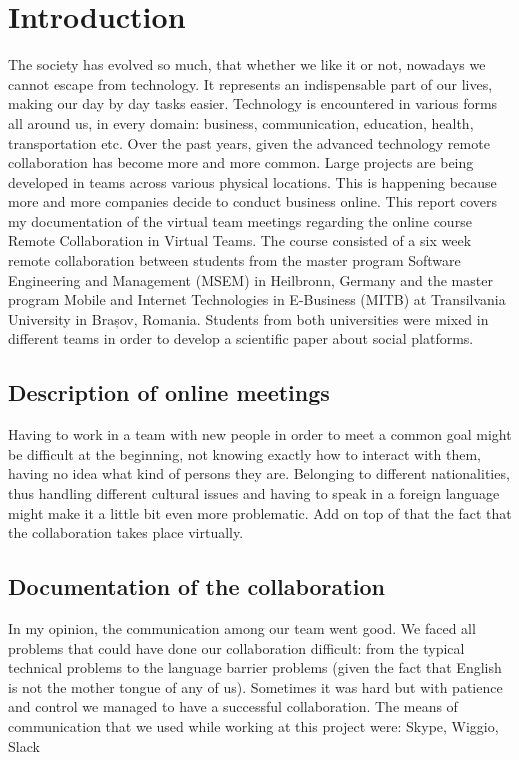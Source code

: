 
\chapter{Introduction } %

\label{ChapterX} %


The society has evolved so much, that whether we like it or not, nowadays we cannot escape from technology. It represents an indispensable part of our lives, making our day by day tasks easier. Technology is encountered in various forms all around us, in every domain: business, communication, education, health, transportation etc. 
Over the past years, given the advanced technology remote collaboration has become more and more common. Large projects are being developed in teams across various physical locations. This is happening because more and more companies decide to conduct business online. 
This report covers my documentation of the virtual team meetings regarding the online course Remote Collaboration in Virtual Teams. The course consisted of a six week remote collaboration between students from the master program Software Engineering and Management (MSEM) in Heilbronn, Germany and the master program Mobile and Internet Technologies in E-Business (MITB) at Transilvania University in Brașov, Romania. Students from both universities were mixed in different teams in order to develop a scientific paper about social platforms.

\section{Description of online meetings}
Having to work in a team with new people in order to meet a common goal might be difficult at the beginning, not knowing exactly how to interact with them, having no idea what kind of persons they are. Belonging to different nationalities, thus handling different cultural issues and having to speak in a foreign language might make it a little bit even more problematic. Add on top of that the fact that the collaboration takes place virtually.


\section{Documentation of the collaboration }
In my opinion, the communication among our team went good. We faced all problems that could have done our collaboration difficult: from the typical technical problems to the language barrier problems (given the fact that English is not the mother tongue of any of us). Sometimes it was hard but with patience and control we managed to have a successful collaboration.
The means of communication that we used while working at this project were: Skype, Wiggio, Slack

